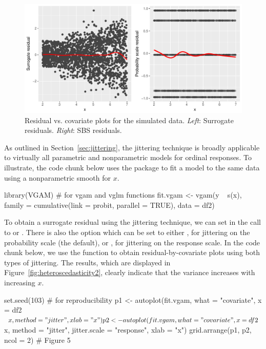 \begin{figure}[!htbp]
  \centering
  \includegraphics[width=1\textwidth]{heteroscedasticity}
  \caption{Residual vs. covariate plots for the simulated data. \textit{Left}: Surrogate residuals. \textit{Right}: SBS residuals.}
  \label{fig:heteroscedasticity}
\end{figure}

As outlined in Section~\ref{sec:jittering}, the jittering technique is broadly applicable to virtually all parametric and nonparametric models for ordinal responses. To illustrate, the code chunk below uses the  package to fit a  model to the same data using a nonparametric smooth for $x$.
\begin{example}
library(VGAM)  # for vgam and vglm functions
fit.vgam <- vgam(y ~ s(x), family = cumulative(link = probit, parallel = TRUE),
                 data = df2)
\end{example}

To obtain a surrogate residual using the jittering technique, we can set  in the call to  or . There is also the option  which can be set to either , for jittering on the probability scale (the default), or , for jittering on the response scale. In the code chunk below, we use the  function to obtain residual-by-covariate plots using both types of jittering. The results, which are displayed in Figure~\ref{fig:heteroscedasticity2}, clearly indicate that the variance increases with increasing $x$.
\begin{example}
set.seed(103)  # for reproducibility
p1 <- autoplot(fit.vgam, what = "covariate", x = df2$x, method = "jitter",
               xlab = "x")
p2 <- autoplot(fit.vgam, what = "covariate", x = df2$x, method = "jitter",
               jitter.scale = "response", xlab = "x")
grid.arrange(p1, p2, ncol = 2)  # Figure 5
\end{example}

